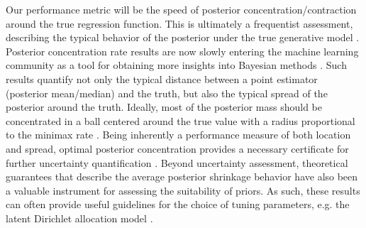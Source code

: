 \documentclass{article}
\newcommand{\1}{\mathbb{I}}
\theoremstyle{assumption}
\begin{document}
Our performance metric will be the speed of posterior concentration/contraction around the true regression function. This is ultimately a frequentist  assessment, describing the typical  behavior of the posterior under the true generative model \cite{Ghosal2000}.  Posterior concentration rate results are now slowly entering the machine learning community as a tool for obtaining more insights into Bayesian methods \cite{Zhang2004, Tang2014, Korda2013, Briol2015, Chen2016}. 
Such results quantify not only the typical distance between a point estimator (posterior mean/median) and the truth, but also the typical spread of the posterior around the truth.   Ideally, most of the posterior mass should be concentrated in a ball centered around the true value with a radius proportional to the minimax rate \cite{Ghosal2000, Ghosal2007}. 
Being inherently a performance measure of both location and spread, optimal posterior concentration provides a necessary certificate for further uncertainty quantification \cite{Szabo2015, Castillo2014, Rousseau2016b}.
Beyond uncertainty assessment, theoretical guarantees that describe  the average posterior shrinkage behavior  have also been a valuable instrument for assessing the suitability of  priors.  As such, these results can often provide useful guidelines for the choice of tuning parameters, e.g. the latent Dirichlet allocation model \cite{Tang2014}. 
\end{document}
